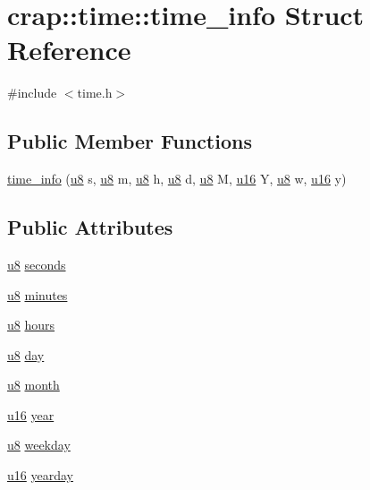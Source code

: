 \hypertarget{structcrap_1_1time_1_1time__info}{\section{crap\-:\-:time\-:\-:time\-\_\-info Struct Reference}
\label{structcrap_1_1time_1_1time__info}
}


{\ttfamily \#include $<$time.\-h$>$}

\subsection*{Public Member Functions}
\begin{DoxyCompactItemize}
\item 
\hyperlink{structcrap_1_1time_1_1time__info_adc92ed9049658fabce02dbdfc4479a17}{time\-\_\-info} (\hyperlink{types_8h_a92c50087ca0e64fa93fc59402c55f8ca}{u8} s, \hyperlink{types_8h_a92c50087ca0e64fa93fc59402c55f8ca}{u8} m, \hyperlink{types_8h_a92c50087ca0e64fa93fc59402c55f8ca}{u8} h, \hyperlink{types_8h_a92c50087ca0e64fa93fc59402c55f8ca}{u8} d, \hyperlink{types_8h_a92c50087ca0e64fa93fc59402c55f8ca}{u8} M, \hyperlink{types_8h_ace9d960e74685e2cd84b36132dbbf8aa}{u16} Y, \hyperlink{types_8h_a92c50087ca0e64fa93fc59402c55f8ca}{u8} w, \hyperlink{types_8h_ace9d960e74685e2cd84b36132dbbf8aa}{u16} y)
\end{DoxyCompactItemize}
\subsection*{Public Attributes}
\begin{DoxyCompactItemize}
\item 
\hyperlink{types_8h_a92c50087ca0e64fa93fc59402c55f8ca}{u8} \hyperlink{structcrap_1_1time_1_1time__info_a9a09f309a2f81e1a8fc5acd2b1876bf5}{seconds}
\item 
\hyperlink{types_8h_a92c50087ca0e64fa93fc59402c55f8ca}{u8} \hyperlink{structcrap_1_1time_1_1time__info_aaf56c55fb9d93178522e98d4f2a8b557}{minutes}
\item 
\hyperlink{types_8h_a92c50087ca0e64fa93fc59402c55f8ca}{u8} \hyperlink{structcrap_1_1time_1_1time__info_a956dc012f40205e9f834d8802feb9642}{hours}
\item 
\hyperlink{types_8h_a92c50087ca0e64fa93fc59402c55f8ca}{u8} \hyperlink{structcrap_1_1time_1_1time__info_adb80a0c67c8f89e4399e64364f5e7c3a}{day}
\item 
\hyperlink{types_8h_a92c50087ca0e64fa93fc59402c55f8ca}{u8} \hyperlink{structcrap_1_1time_1_1time__info_a69449bc6ce083b864f4a3acbf599b58a}{month}
\item 
\hyperlink{types_8h_ace9d960e74685e2cd84b36132dbbf8aa}{u16} \hyperlink{structcrap_1_1time_1_1time__info_aab40e5fecd12881e84dea8449c7dc7b2}{year}
\item 
\hyperlink{types_8h_a92c50087ca0e64fa93fc59402c55f8ca}{u8} \hyperlink{structcrap_1_1time_1_1time__info_a53f401c11fa1b828ab59d9f46c31939d}{weekday}
\item 
\hyperlink{types_8h_ace9d960e74685e2cd84b36132dbbf8aa}{u16} \hyperlink{structcrap_1_1time_1_1time__info_a286c0bab84aba2063b13770ab235e4e3}{yearday}
\end{DoxyCompactItemize}


